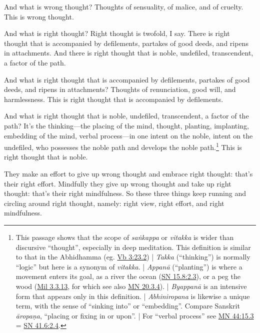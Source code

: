 \documentclass[12pt,openany]{book}%
\begin{document}
And what is wrong thought? Thoughts of sensuality, of malice, and of cruelty. This is wrong thought. 

And what is right thought? Right thought is twofold, I say. There is right thought that is accompanied by defilements, partakes of good deeds, and ripens in attachments. And there is right thought that is noble, undefiled, transcendent, a factor of the path. 

And what is right thought that is accompanied by defilements, partakes of good deeds, and ripens in attachments? Thoughts of renunciation, good will, and harmlessness. This is right thought that is accompanied by defilements. 

And what is right thought that is noble, undefiled, transcendent, a factor of the path? It’s the thinking—the placing of the mind, thought, planting, implanting, embedding of the mind, verbal process—in one intent on the noble, intent on the undefiled, who possesses the noble path and develops the noble path.\footnote{This passage shows that the scope of \textit{\textsanskrit{saṅkappa}} or \textit{vitakka} is wider than discursive “thought”, especially in deep meditation. This definition is similar to that in the Abhidhamma (eg. \href{https://suttacentral.net/vb3/en/sujato\#23.2}{Vb 3:23.2}) | \textit{Takka} (“thinking”) is normally “logic” but here is a synonym of \textit{vitakka}. | \textit{\textsanskrit{Appanā}} (“planting”) is where a movement enters its goal, as a river the ocean (\href{https://suttacentral.net/sn15.8/en/sujato\#2.3}{SN 15.8:2.3}), or a peg the wood (\href{https://suttacentral.net/mil3.3.13/en/sujato}{Mil 3.3.13}, for which see also \href{https://suttacentral.net/mn20.3.4/en/sujato}{MN 20.3.4}). | \textit{\textsanskrit{Byappanā}} is an intensive form that appears only in this definition. | \textit{Abhiniropana} is likewise a unique term, with the sense of “sinking into” or “embedding”. Compare Sanskrit \textit{\textsanskrit{āropaṇa}}, “placing or fixing in or upon”. | For “verbal process” see \href{https://suttacentral.net/mn44/en/sujato\#15.3}{MN 44:15.3} = \href{https://suttacentral.net/sn41.6/en/sujato\#2.4}{SN 41.6:2.4}. } This is right thought that is noble. 

They make an effort to give up wrong thought and embrace right thought: that’s their right effort. Mindfully they give up wrong thought and take up right thought: that’s their right mindfulness. So these three things keep running and circling around right thought, namely: right view, right effort, and right mindfulness. 
\end{document}
